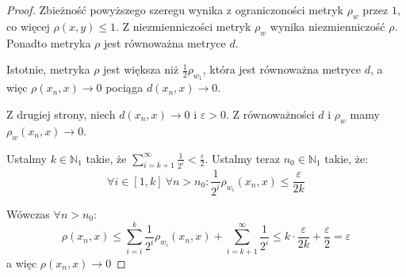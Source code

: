 \begin{thm}
\begin{proof}
    Zbieżność powyższego szeregu wynika z ograniczoności metryk $\rho_w$ przez $1$, co więcej $\rho(x,y) \leq 1$. Z niezmienniczości metryk $\rho_w$ wynika niezmienniczość $\rho$. Ponadto metryka $\rho$ jest równoważna metryce $d$.
    
    Istotnie, metryka $\rho$ jest większa niż $\frac{1}{2} \rho_{w_1}$, która jest równoważna metryce $d$, a więc $\rho(x_n, x) \to 0$ pociąga $d(x_n, x) \to 0$.
    
    Z drugiej strony, niech $d(x_n, x) \to 0$ i $\varepsilon > 0$. Z równoważności $d$ i $\rho_w$ mamy $\rho_w(x_n, x) \to 0$.
    
    Ustalmy $k \in \mathbb{N}_1$ takie, że $\sum_{i=k+1}^\infty \frac{1}{2^i} < \frac{\varepsilon}{2}$.
    Ustalmy teraz $n_0 \in \mathbb{N}_1$ takie, że:
    \[\forall i \in [1,k]\ \forall n > n_0: \frac{1}{2^i} \rho_{w_i}(x_n, x) \leq \frac{\varepsilon}{2k}\]
    
    Wówczas $\forall n > n_0$:
    \[\rho(x_n, x) \leq \sum_{i=i}^k \frac{1}{2^i} \rho_{w_i}(x_n, x) + \sum_{i=k+1}^\infty \frac{1}{2^i} \leq k \cdot \frac{\varepsilon}{2k} + \frac{\varepsilon}{2} = \varepsilon\]
    a więc $\rho(x_n, x) \to 0$
    

\end{proof}
\end{thm}
